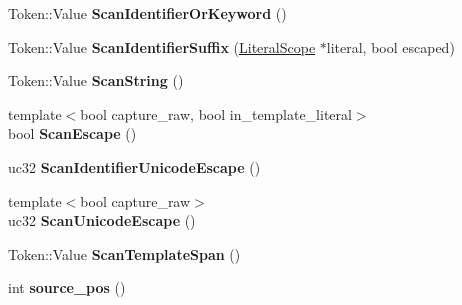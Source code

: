 \begin{DoxyCompactItemize}
\item 
Token\+::\+Value {\bfseries Scan\+Identifier\+Or\+Keyword} ()\hypertarget{classv8_1_1internal_1_1_scanner_a9d805d1d94f0787420746e8e727b428b}{}\label{classv8_1_1internal_1_1_scanner_a9d805d1d94f0787420746e8e727b428b}

\item 
Token\+::\+Value {\bfseries Scan\+Identifier\+Suffix} (\hyperlink{classv8_1_1internal_1_1_scanner_1_1_literal_scope}{Literal\+Scope} $\ast$literal, bool escaped)\hypertarget{classv8_1_1internal_1_1_scanner_a7fc7d14a8a00ae1ae58ab2de55c3c1b5}{}\label{classv8_1_1internal_1_1_scanner_a7fc7d14a8a00ae1ae58ab2de55c3c1b5}

\item 
Token\+::\+Value {\bfseries Scan\+String} ()\hypertarget{classv8_1_1internal_1_1_scanner_a47619e820377e244e7207be1657c34f0}{}\label{classv8_1_1internal_1_1_scanner_a47619e820377e244e7207be1657c34f0}

\item 
{\footnotesize template$<$bool capture\+\_\+raw, bool in\+\_\+template\+\_\+literal$>$ }\\bool {\bfseries Scan\+Escape} ()\hypertarget{classv8_1_1internal_1_1_scanner_a2e80d7c4ceafc881909b7bd80bbf46dc}{}\label{classv8_1_1internal_1_1_scanner_a2e80d7c4ceafc881909b7bd80bbf46dc}

\item 
uc32 {\bfseries Scan\+Identifier\+Unicode\+Escape} ()\hypertarget{classv8_1_1internal_1_1_scanner_add4de0e69a69e4a3e9c6bc045fcb6122}{}\label{classv8_1_1internal_1_1_scanner_add4de0e69a69e4a3e9c6bc045fcb6122}

\item 
{\footnotesize template$<$bool capture\+\_\+raw$>$ }\\uc32 {\bfseries Scan\+Unicode\+Escape} ()\hypertarget{classv8_1_1internal_1_1_scanner_a62b98646d3c13f47ff094515b9e35d2b}{}\label{classv8_1_1internal_1_1_scanner_a62b98646d3c13f47ff094515b9e35d2b}

\item 
Token\+::\+Value {\bfseries Scan\+Template\+Span} ()\hypertarget{classv8_1_1internal_1_1_scanner_a47ad87acf30bb8ebcae66ae974926282}{}\label{classv8_1_1internal_1_1_scanner_a47ad87acf30bb8ebcae66ae974926282}

\item 
int {\bfseries source\+\_\+pos} ()\hypertarget{classv8_1_1internal_1_1_scanner_aaacf33c1e190e297d4329cb0d7eaf865}{}\label{classv8_1_1internal_1_1_scanner_aaacf33c1e190e297d4329cb0d7eaf865}

\end{DoxyCompactItemize}
